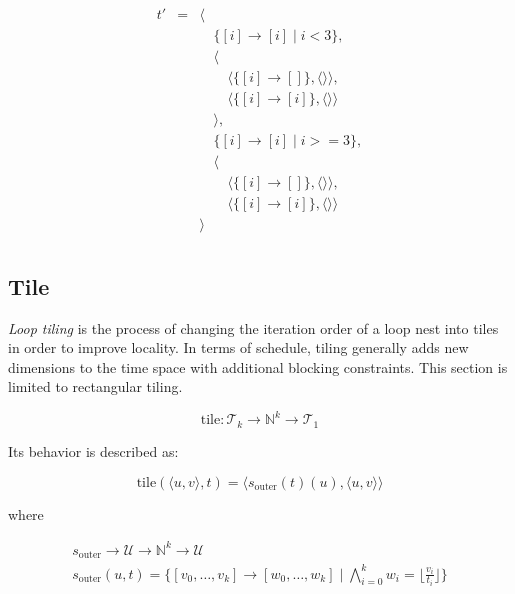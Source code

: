 \documentclass{article}
\begin{document}
\[
    \begin{array}{lcl}
        t'&=& \langle \\
          & & \quad\{[i] \rightarrow [i] \mid i < 3 \},\\
          & & \quad\langle \\
          & & \quad\quad \langle\{ [i] \rightarrow [] \}, \langle\rangle\rangle,\\
          & & \quad\quad \langle\{ [i] \rightarrow [i] \}, \langle\rangle\rangle\\
          & & \quad\rangle, \\
          & & \quad\{[i] \rightarrow [i] \mid i >= 3 \},\\
          & & \quad\langle \\
          & & \quad\quad \langle\{ [i] \rightarrow [] \}, \langle\rangle\rangle,\\
          & & \quad\quad \langle\{ [i] \rightarrow [i] \}, \langle\rangle\rangle\\
          & & \rangle \\
    \end{array}
\]

\subsection{Tile}

\emph{Loop tiling} is the process of changing the iteration order of a loop
nest into tiles in order to improve locality. In terms of schedule, tiling
generally adds new dimensions to the time space with additional blocking
constraints. This section is limited to rectangular tiling.

\[
    \mathrm{tile}: \mathcal{T}_k \rightarrow \mathbb{N}^k \rightarrow \mathcal{T}_1
\]

Its behavior is described as:

\[
    \mathrm{tile}(\langle u, v\rangle, t) = \langle  s_\mathrm{outer}(t)(u), \langle  u, v \rangle \rangle
\]

\noindent where

\[
    \begin{array}{l}
        s_\mathrm{outer} \rightarrow \mathcal{U} \rightarrow \mathbb{N}^k \rightarrow \mathcal{U} \\
        s_\mathrm{outer}(u, t) = \{ [v_0, \ldots, v_k] \rightarrow [w_0, \ldots, w_k] \mid \bigwedge_{i=0}^k w_i = \lfloor \frac{v_i}{t_i} \rfloor \}
    \end{array}
\]
\end{document}
